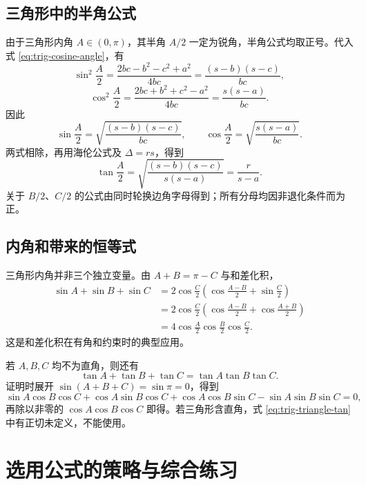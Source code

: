 \documentclass[UTF8]{ctexart}
\begin{document}
\subsection{三角形中的半角公式}

由于三角形内角 $A\in(0,\pi)$，其半角 $A/2$ 一定为锐角，半角公式均取正号。代入式 \eqref{eq:trig-cosine-angle}，有
\[
  \sin^2\frac A2
  =\frac{2bc-b^2-c^2+a^2}{4bc}
  =\frac{(s-b)(s-c)}{bc},
\]
\[
  \cos^2\frac A2
  =\frac{2bc+b^2+c^2-a^2}{4bc}
  =\frac{s(s-a)}{bc}.
\]
因此
\begin{equation}\label{eq:trig-triangle-half}
  \boxed{\sin\frac A2=\sqrt{\frac{(s-b)(s-c)}{bc}},\qquad
  \cos\frac A2=\sqrt{\frac{s(s-a)}{bc}}}.
\end{equation}
两式相除，再用海伦公式及 $\Delta=rs$，得到
\begin{equation}\label{eq:trig-triangle-half-tan}
  \tan\frac A2
  =\sqrt{\frac{(s-b)(s-c)}{s(s-a)}}=\frac r{s-a}.
\end{equation}
关于 $B/2$、$C/2$ 的公式由同时轮换边角字母得到；所有分母均因非退化条件而为正。

\subsection{内角和带来的恒等式}

三角形内角并非三个独立变量。由 $A+B=\pi-C$ 与和差化积，
\begin{align*}
  \sin A+\sin B+\sin C
  &=2\cos\frac C2\left(\cos\frac{A-B}{2}+\sin\frac C2\right)\\
  &=2\cos\frac C2\left(\cos\frac{A-B}{2}+\cos\frac{A+B}{2}\right)\\
  &=4\cos\frac A2\cos\frac B2\cos\frac C2.
\end{align*}
这是和差化积在有角和约束时的典型应用。

若 $A,B,C$ 均不为直角，则还有
\begin{equation}\label{eq:trig-triangle-tan}
  \tan A+\tan B+\tan C=\tan A\tan B\tan C.
\end{equation}
证明时展开 $\sin(A+B+C)=\sin\pi=0$，得到
\[
  \sin A\cos B\cos C+\cos A\sin B\cos C
  +\cos A\cos B\sin C-\sin A\sin B\sin C=0,
\]
再除以非零的 $\cos A\cos B\cos C$ 即得。若三角形含直角，式 \eqref{eq:trig-triangle-tan} 中有正切未定义，不能使用。

\section{选用公式的策略与综合练习}
\end{document}
